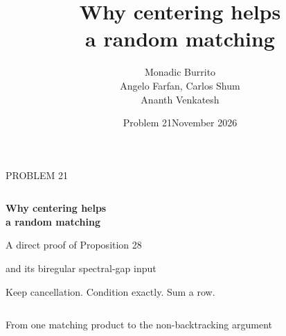 \documentclass[aspectratio=169,11pt]{beamer}
\title{Why centering helps\protect\\a random matching}
\author{\texorpdfstring{Monadic Burrito\\[1mm]Angelo Farfan, Carlos Shum\\Ananth Venkatesh}{}}
\date{Problem 21\quad November 2026}
\newcommand{\slidesource}{}
\newcommand{\source}[1]{\gdef\slidesource{#1}}
\newcommand{\1}{\mathbf 1}
\newcommand{\smallgap}{\vspace{2mm}}
\newcommand{\cellgrid}{\draw[grid,step=0.45] (0,0) grid (2.25,2.25);}
\begin{document}
\setlength{\abovedisplayskip}{7pt}
\setlength{\belowdisplayskip}{7pt}
\setlength{\abovedisplayshortskip}{4pt}
\setlength{\belowdisplayshortskip}{4pt}

\source{Problem 21 submission. The report contains the full proofs, source audit and tool-use record.}
\begin{frame}[plain]
\vspace{5mm}
{\color{teal}\normalsize PROBLEM 21}\par\vspace{5mm}
\begin{columns}[T,onlytextwidth]
\begin{column}{0.69\textwidth}
{\fontsize{26}{30}\selectfont\bfseries Why centering helps\\a random matching}\par
\vspace{5mm}
{\large A direct proof of Proposition 28}\par
\smallgap
{\large and its biregular spectral-gap input}\par
\vspace{7mm}
{\color{muted}\normalsize Keep cancellation. Condition exactly. Sum a row.}
\par\vspace{3mm}
{\color{muted}\normalsize\insertauthor}
\end{column}
\begin{column}{0.27\textwidth}
\centering
{}
\end{column}
\end{columns}
\vfill
{\color{navy}\large From one matching product to the non-backtracking argument}
\end{frame}
\end{document}

